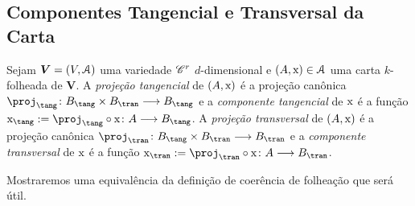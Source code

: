 \subsection{Componentes Tangencial e Transversal da Carta}

\begin{defi}
Sejam $\bm V = (V,\mathcal{A})$ uma variedade $\mathscr{C}^r$ $d$-dimensional e $(A,\mathrm{x}) \in \mathcal{A}$ uma carta $k$-folheada de $\bm V$. A \emph{projeção tangencial} de $(A,\mathrm{x})$ é a projeção canônica $\proj_\tang\colon B_\tang \times B_\tran \to B_\tang$ e a \emph{componente tangencial} de $\mathrm{x}$ é a função $\x_\tang := \proj_\tang \circ \x\colon A \to B_\tang$. A \emph{projeção transversal} de $(A,\mathrm{x})$ é a projeção canônica $\proj_\tran\colon B_\tang \times B_\tran \to B_\tran$ e a \emph{componente transversal} de $\mathrm{x}$ é a função $\x_\tran := \proj_\tran \circ \x\colon A \to B_\tran$.
\end{defi}


Mostraremos uma equivalência da definição de coerência de folheação que será útil.

